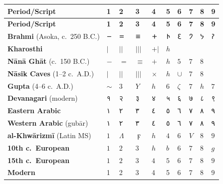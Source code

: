 \documentclass[11pt,a4paper]{article}
\newcommand{\ar}[1]{{\arabicfont #1}}
\newcommand{\dev}[1]{{\devanagarifont #1}}
\begin{document}
\begin{center}
\small
\renewcommand{\arraystretch}{1.5}
\begin{longtable}{|C{2.8cm}|C{1.3cm}|C{1.3cm}|C{1.3cm}|C{1.3cm}|C{1.3cm}|C{1.3cm}|C{1.3cm}|C{1.3cm}|}
\hline
{}
\textbf{Period/Script} & \textbf{1} & \textbf{2} & \textbf{3} & \textbf{4} & \textbf{5} & \textbf{6} & \textbf{7} & \textbf{8} & \textbf{9} \\
\hline
\endfirsthead
\hline
{}
\textbf{Period/Script} & \textbf{1} & \textbf{2} & \textbf{3} & \textbf{4} & \textbf{5} & \textbf{6} & \textbf{7} & \textbf{8} & \textbf{9} \\
\hline
\endhead
\textbf{Brahmi} (Asoka, c.~250 B.C.) & \dev{𑁒} & \dev{𑁓} & \dev{𑁔} & \dev{𑁕} & \dev{𑁖} & \dev{𑁗} & \dev{𑁘} & \dev{𑁙} & \dev{𑁚} \\
\hline
\textbf{Kharosthi} & $|$ & $||$ & $|||$ & $+\!|$ & $h$ & & & & \\
\hline
\textbf{N\=an\=a Gh\=at} (c.~150 B.C.) & $-$ & $=$ & $\equiv$ & $+$ & $h$ & $5$ & $7$ & $8$ & \\
\hline
\textbf{N\=asik Caves} (1--2 c.~A.D.) & $|$ & $||$ & $|||$ & $\times$ & $h$ & $\cup$ & $7$ & $8$ & \\
\hline
\textbf{Gupta} (4--6 c.~A.D.) & $\sim$ & $3$ & $Y$ & $h$ & $6$ & $\zeta$ & $7$ & $h$ & $7$ \\
\hline
\textbf{Devanagari} (modern) & \dev{१} & \dev{२} & \dev{३} & \dev{४} & \dev{५} & \dev{६} & \dev{७} & \dev{८} & \dev{९} \\
\hline
\hline
\textbf{Eastern Arabic} & \ar{١} & \ar{٢} & \ar{٣} & \ar{٤} & \ar{٥} & \ar{٦} & \ar{٧} & \ar{٨} & \ar{٩} \\
\hline
\textbf{Western Arabic} (gub\=ar) & \ar{١} & \ar{٢} & \ar{٣} & \ar{٤} & \ar{٥} & \ar{٦} & \ar{٧} & \ar{٨} & \ar{٩} \\
\hline
\textbf{al-Khw\=arizm\=i} (Latin MS) & $1$ & $\Lambda$ & $\digamma$ & $h$ & $4$ & $6$ & $V$ & $8$ & $9$ \\
\hline
\hline
\textbf{10th c.~European} & $1$ & $2$ & $3$ & $h$ & $b$ & $6$ & $7$ & $8$ & $g$ \\
\hline
\textbf{15th c.~European} & $1$ & $2$ & $3$ & $4$ & $5$ & $6$ & $7$ & $8$ & $9$ \\
\hline
\textbf{Modern} & 1 & 2 & 3 & 4 & 5 & 6 & 7 & 8 & 9 \\
\hline
\end{longtable}
\end{center}

\vspace{1em}
\end{document}
